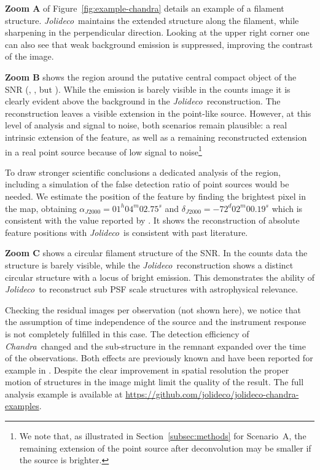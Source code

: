 \documentclass[twocolumn]{aastex631}
\newcommand{\chandra}{\textit{Chandra}~}
\newcommand{\jolideco}{\textit{Jolideco}~}
\begin{document}
    \textbf{Zoom A} of Figure~\ref{fig:example-chandra} details an example of a filament structure. \jolideco maintains the extended structure along the filament, while sharpening in the perpendicular direction. Looking at the upper right corner one can also see that weak background emission is suppressed, improving the contrast of the image.
    
    \textbf{Zoom B} shows the region around the putative central compact object of the SNR (\cite{Vogt2018}, \cite{Hebbar2020}, but \cite{Long2020}). While the emission is barely visible in the counts image it is clearly evident above the background in the \jolideco reconstruction. The reconstruction leaves a visible extension in the point-like source. However, at this level of analysis and signal to noise, both scenarios remain plausible: a real intrinsic extension of the feature, as well as a remaining reconstructed extension in a real point source because of low signal to noise\footnote{We note that, as illustrated in Section~\ref{subsec:methods} for Scenario~A, the remaining extension of the point source after deconvolution may be smaller if the source is brighter.} 
    
    To draw stronger scientific conclusions a dedicated analysis of the region, including a simulation of the false detection ratio of point sources would be needed. We estimate the position of the feature by finding the brightest pixel in the map, obtaining $\alpha_{J2000}=01^h04^m02.75^s$ and $\delta_{J2000}=-72^d02^m00.19^s$ which is consistent with the value reported by \cite{Long2020}. It shows the reconstruction of absolute feature positions with \jolideco is consistent with past literature.
    
    \textbf{Zoom C} shows a circular filament structure of the SNR. In the counts data the structure is barely visible, while the \jolideco reconstruction shows a distinct circular structure with a locus of bright emission. This demonstrates the ability of \jolideco to reconstruct sub PSF scale structures with astrophysical relevance.

    Checking the residual images per observation (not shown here), we notice that the assumption of time independence of the source and the instrument response is not completely fulfilled in this case. The detection efficiency of \chandra changed and the sub-structure in the remnant expanded over the time of the observations. Both effects are previously known and have been reported for example in \cite{Xi2019}. Despite the clear improvement in spatial resolution the proper motion of structures in the image might limit the quality of the result. The full analysis example is available at \url{https://github.com/jolideco/jolideco-chandra-examples}.
\end{document}
